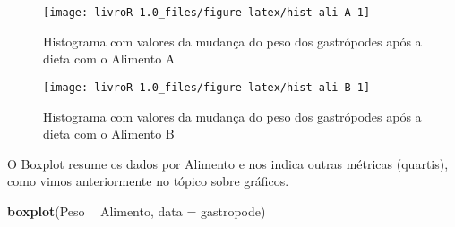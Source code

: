 \documentclass[14pt,titlepage, oneside, openany, a4paper]{book}
\newenvironment{Shaded}{\begin{snugshade}}{\end{snugshade}}
\newcommand{\DataTypeTok}[1]{\textcolor[rgb]{0.13,0.29,0.53}{#1}}
\newcommand{\KeywordTok}[1]{\textcolor[rgb]{0.13,0.29,0.53}{\textbf{#1}}}
\newcommand{\NormalTok}[1]{#1}
\newcommand{\OperatorTok}[1]{\textcolor[rgb]{0.81,0.36,0.00}{\textbf{#1}}}
\newcommand{\StringTok}[1]{\textcolor[rgb]{0.31,0.60,0.02}{#1}}
\begin{document}
\begin{Shaded}
\end{Shaded}

\begin{figure}[H]

{\centering \texttt{[image: livroR-1.0\_files/figure-latex/hist-ali-A-1]} 

}

\caption{Histograma com valores da mudança do peso dos gastrópodes após a dieta com o Alimento A}\label{fig:hist-ali-A}
\end{figure}

\begin{Shaded}
\end{Shaded}

\begin{figure}[H]

{\centering \texttt{[image: livroR-1.0\_files/figure-latex/hist-ali-B-1]} 

}

\caption{Histograma com valores da mudança do peso dos gastrópodes após a dieta com o Alimento B}\label{fig:hist-ali-B}
\end{figure}

O Boxplot resume os dados por Alimento e nos indica outras métricas (quartis), como vimos anteriormente no tópico sobre gráficos.

\begin{Shaded}
\begin{Highlighting}[]
\KeywordTok{boxplot}\NormalTok{(Peso }\OperatorTok{~}\StringTok{ }\NormalTok{Alimento, }\DataTypeTok{data =}\NormalTok{ gastropode)}
\end{Highlighting}
\end{Shaded}
\end{document}
